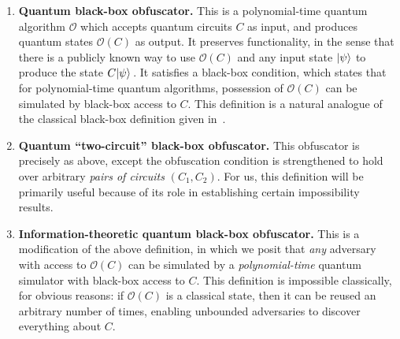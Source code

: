 \documentclass[11pt]{article}
\numberwithin{equation}{section}
\newcommand{\algo}{\mathcal}
\begin{document}
{\begin{enumerate}
\item \textbf{Quantum black-box obfuscator.} This is a polynomial-time quantum algorithm $\algo O$ which accepts quantum circuits $C$ as input, and produces quantum states $\algo O(C)$ as output. It preserves functionality, in the sense that there is a publicly known way to use $\algo O(C)$ and any input state ${\left\vert{\psi}\right\rangle}$ to produce the state $C {\left\vert{\psi}\right\rangle}$\,. It satisfies a black-box condition, which states that for polynomial-time quantum algorithms, possession of $\algo O(C)$ can be simulated by black-box access to $C$. This definition is a natural analogue of the classical black-box definition given in~\cite{BGIRSVY12}.
\item \textbf{Quantum ``two-circuit'' black-box obfuscator.} This obfuscator is precisely as above, except the obfuscation condition is strengthened to hold over arbitrary \emph{pairs of circuits} $(C_1, C_2)$. For us, this definition will be primarily useful because of its role in establishing certain impossibility results.
\item \textbf{Information-theoretic quantum black-box obfuscator.} This is a modification of the above definition, in which we posit that \emph{any} adversary with access to $\algo O(C)$ can be simulated by a \emph{polynomial-time} quantum simulator with black-box access to $C$. This definition is impossible classically, for obvious reasons: if $\algo O(C)$ is a classical state, then it can be reused an arbitrary number of times, enabling unbounded adversaries to discover everything about $C$.
\end{enumerate}

}
\end{document}
